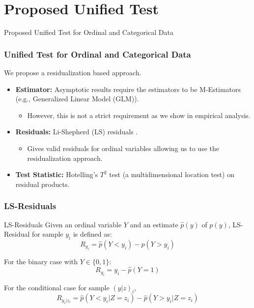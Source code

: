 \documentclass{beamer}
\begin{document}
\section{Proposed Unified Test}
\begin{frame}
	\begin{center} \Huge{Proposed Unified Test for Ordinal and Categorical Data} \end{center}
\end{frame}
\begin{frame}
	\frametitle{Unified Test for Ordinal and Categorical Data}
	We propose a residualization based approach.
	\vspace{1em}
	\begin{itemize}
		\setlength\itemsep{1em}
		\item \textbf{Estimator:} Asymptotic results require the
			estimators to be M-Estimators (e.g., Generalized Linear
			Model (GLM)).
			\begin{itemize}
				\item However, this is not a strict requirement as we show in empirical analysis.
			\end{itemize}
		\item \textbf{Residuals:} Li-Shepherd (LS) residuals \footnotemark.
			\begin{itemize}
				\item Gives valid residuals for ordinal
					variables allowing us to use the
					residualization approach.
			\end{itemize}
		\item \textbf{Test Statistic:} Hotelling's $ T^2 $ test (a
			multidimensional location test) on residual products.
	\end{itemize}
\end{frame}


\begin{frame}
	\frametitle{LS-Residuals}
	\begin{block}{LS-Residuals}
	Given an ordinal variable $ Y $ and an estimate $ \hat{p}(y) $ of $
	p(y) $, LS-Residual for sample $ y_i $ is defined as:
	$$ R_{y_i} = \hat{p}(Y < y_i) - \hat{p}(Y > y_i) $$
	\end{block}

	For the binary case with $ Y \in \{0, 1\} $:
	$$ R_{y_i} = y_i - \hat{p}(Y = 1) $$

	For the conditional case for sample $ (y|z)_i $,
	$$ R_{y_i | z_i} = \hat{p}(Y < y_i | Z=z_i) - \hat{p}(Y>y_i|Z=z_i) $$

\end{frame}
\end{document}
